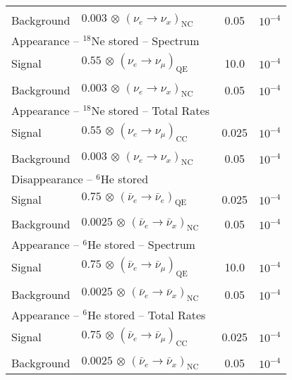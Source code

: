 \begin{appendix}
\begin{center}
\begin{tabular}{|l|ll|c|c|}
 & & & & \\
Background & $0.003 \, \otimes \, (\nu_e \rightarrow \nu_x)_\mathrm{NC}$ & & 0.05 & $10^{-4}$ \\ \hline \hline 
\multicolumn{3}{|l|}{Appearance -- $^{18}$Ne stored -- Spectrum} & & \\ \hline
Signal & $0.55 \, \otimes \, (\nu_e \rightarrow \nu_\mu)_\mathrm{QE}$ & & 10.0 & $10^{-4}$ \\
 & & & & \\
Background & $0.003 \, \otimes \, (\nu_e \rightarrow \nu_x)_\mathrm{NC}$ & & 0.05 & $10^{-4}$
\\ \hline \hline
\multicolumn{3}{|l|}{Appearance -- $^{18}$Ne stored -- Total Rates} & & \\ \hline
Signal & $0.55 \, \otimes \, (\nu_e \rightarrow \nu_\mu)_\mathrm{CC}$ & & 0.025 & $10^{-4}$ \\
 & & & & \\
Background & $0.003 \, \otimes \, (\nu_e \rightarrow \nu_x)_\mathrm{NC}$ & & 0.05 & $10^{-4}$
\\ \hline \hline\multicolumn{3}{|l|}{Disappearance -- $^6$He stored} & &  \\ \hline
Signal & $0.75 \, \otimes \, (\bar{\nu}_e\rightarrow\bar{\nu}_e)_{\mathrm{QE}}$ & & 0.025 & $10^{-4}$ \\
 & & & & \\
Background & $0.0025 \, \otimes \, (\bar{\nu}_e \rightarrow \bar{\nu}_x)_\mathrm{NC}$ & & 0.05 & $10^{-4}$ \\ \hline \hline 
\multicolumn{3}{|l|}{Appearance -- $^6$He stored -- Spectrum} & & \\ \hline
Signal & $0.75 \, \otimes \, (\bar{\nu}_e \rightarrow \bar{\nu}_\mu)_\mathrm{QE}$ & &
10.0 & $10^{-4}$ \\
 & & & & \\
Background & $0.0025 \, \otimes \, (\bar{\nu}_e \rightarrow \bar{\nu}_x)_\mathrm{NC}$ & & 0.05 & $10^{-4}$ \\ \hline \hline
\multicolumn{3}{|l|}{Appearance -- $^6$He stored -- Total Rates} & & \\ \hline
Signal & $0.75 \, \otimes \, (\bar{\nu}_e \rightarrow \bar{\nu}_\mu)_\mathrm{CC}$ & &
0.025 & $10^{-4}$ \\
 & & & & \\
Background & $0.0025 \, \otimes \, (\bar{\nu}_e \rightarrow \bar{\nu}_x)_\mathrm{NC}$ & & 0.05 & $10^{-4}$ \\ \hline \hline
\end{tabular}
\end{center}


\end{appendix}
